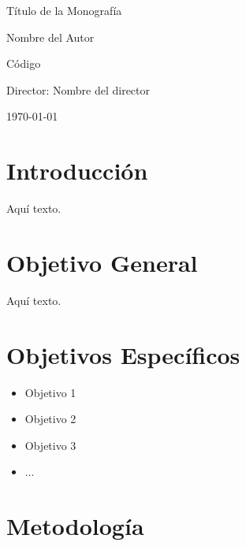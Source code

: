 \documentclass[12pt]{article}
\begin{document}
\begin{center}
\Huge
Título de la Monografía

\vspace{3mm}
\Large Nombre del Autor

\large
Código


\vspace{2mm}
\Large
Director: Nombre del director

\normalsize
\vspace{2mm}

\today
\end{center}


\normalsize
\section{Introducción}


Aqu\'i texto.


\section{Objetivo General}


Aqu\'i texto.


\section{Objetivos Específicos}


\begin{itemize}
	\item Objetivo 1
	\item Objetivo 2
	\item Objetivo 3
	\item ...
\end{itemize}

\section{Metodología}

\end{document}
